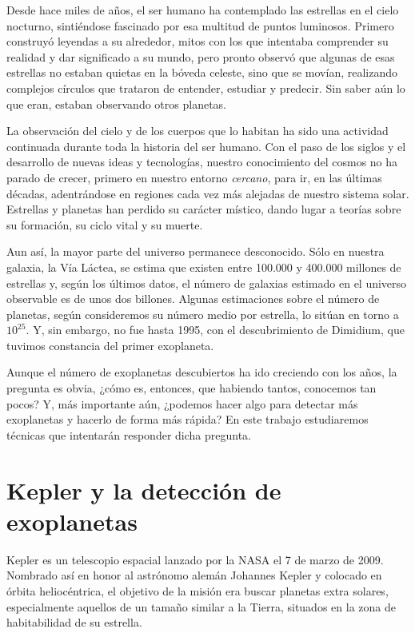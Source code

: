 
Desde hace miles de años, el ser humano ha contemplado las estrellas en el cielo nocturno, sintiéndose fascinado por esa multitud de puntos luminosos. Primero construyó leyendas a su alrededor, mitos con los que intentaba comprender su realidad y dar significado a su mundo, pero pronto observó que algunas de esas estrellas no estaban quietas en la bóveda celeste, sino que se movían, realizando complejos círculos que trataron de entender, estudiar y predecir. Sin saber aún lo que eran, estaban observando otros planetas. 

La observación del cielo y de los cuerpos que lo habitan ha sido una actividad continuada durante toda la historia del ser humano. Con el paso de los siglos y el desarrollo de nuevas ideas y tecnologías, nuestro conocimiento del cosmos no ha parado de crecer, primero en nuestro entorno \textit{cercano}, para ir, en las últimas décadas, adentrándose en regiones cada vez más alejadas de nuestro sistema solar. Estrellas y planetas han perdido su carácter místico, dando lugar a teorías sobre su formación, su ciclo vital y su muerte.

Aun así, la mayor parte del universo permanece desconocido. Sólo en nuestra galaxia, la Vía Láctea, se estima que existen entre 100.000 y 400.000 millones de estrellas y, según los últimos datos, el número de galaxias estimado en el universo observable es de unos dos billones. Algunas estimaciones sobre el número de planetas, según consideremos su número medio por estrella, lo sitúan en torno a $10^{25}$. Y, sin embargo, no fue hasta 1995, con el descubrimiento de Dimidium, que tuvimos constancia del primer exoplaneta.

Aunque el número de exoplanetas descubiertos ha ido creciendo con los años, la pregunta es obvia, ¿cómo es, entonces, que habiendo tantos, conocemos tan pocos? Y, más importante aún, ¿podemos hacer algo para detectar más exoplanetas y hacerlo de forma más rápida? En este trabajo estudiaremos técnicas que intentarán responder dicha pregunta.    

\section{Kepler y la detección de exoplanetas}

Kepler es un telescopio espacial lanzado por la NASA el 7 de marzo de 2009. Nombrado así en honor al astrónomo alemán Johannes Kepler y colocado en órbita heliocéntrica, el objetivo de la misión era buscar planetas extra solares, especialmente aquellos de un tamaño similar a la Tierra, situados en la zona de habitabilidad de su estrella.

